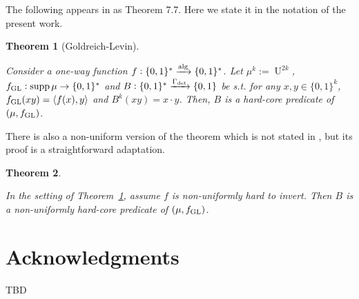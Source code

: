 \documentclass{article}
\numberwithin{equation}{section}
\theoremstyle{definition}
\theoremstyle{plain}
\newtheorem{theorem}{Theorem}[section]
\newcommand{\Bool}{\{0,1\}}
\newcommand{\Words}{{\Bool^*}}
\newcommand{\WordsLen}[1]{{\Bool^{#1}}}
\DeclareMathOperator{\Supp}{supp}
\DeclareMathOperator{\Un}{U}
\newcommand{\Chev}[1]{\langle #1 \rangle}
\newcommand{\Alg}{\xrightarrow{\textnormal{alg}}}
\begin{document}
The following appears in \cite{Goldreich_2008} as Theorem 7.7. Here we state it in the notation of the present work.

\begin{theorem}[Goldreich-Levin]
\label{thm:goldreich_levin}

Consider a one-way function ${f: \Words \Alg \Words}$. Let $\mu^k:=\Un^{2k}$, $f_{\textnormal{GL}}: \Supp \mu \rightarrow \Words$ and ${B: \Words \xrightarrow{\Gamma_{\textnormal{det}}} \Bool}$ be s.t. for any $x,y \in \WordsLen{k}$, $f_{\textnormal{GL}}(xy)=\Chev{f(x),y}$ and ${B^k(xy)=x \cdot y}$. Then, $B$ is a hard-core predicate of $(\mu, f_{\textnormal{GL}})$.

\end{theorem}

There is also a non-uniform version of the theorem which is not stated in \cite{Goldreich_2008}, but its proof is a straightforward adaptation.

\begin{theorem}
\label{thm:goldreich_levin_circ}

In the setting of Theorem~\ref{thm:goldreich_levin}, assume $f$ is non-uniformly hard to invert. Then $B$ is a non-uniformly hard-core predicate of $(\mu, f_{\textnormal{GL}})$.
\end{theorem}

\section*{Acknowledgments}

TBD



\end{document}
